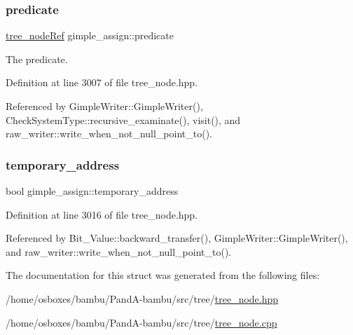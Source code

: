 \subsubsection{\texorpdfstring{predicate}{predicate}}
{\footnotesize\ttfamily \hyperlink{tree__node_8hpp_a6ee377554d1c4871ad66a337eaa67fd5}{tree\+\_\+node\+Ref} gimple\+\_\+assign\+::predicate}



The predicate. 



Definition at line 3007 of file tree\+\_\+node.\+hpp.



Referenced by Gimple\+Writer\+::\+Gimple\+Writer(), Check\+System\+Type\+::recursive\+\_\+examinate(), visit(), and raw\+\_\+writer\+::write\+\_\+when\+\_\+not\+\_\+null\+\_\+point\+\_\+to().

\mbox{\label{structgimple__assign_aa674c74327e0f2f526424ca35dd453c8}} 
\subsubsection{\texorpdfstring{temporary\+\_\+address}{temporary\_address}}
{\footnotesize\ttfamily bool gimple\+\_\+assign\+::temporary\+\_\+address}



Definition at line 3016 of file tree\+\_\+node.\+hpp.



Referenced by Bit\+\_\+\+Value\+::backward\+\_\+transfer(), Gimple\+Writer\+::\+Gimple\+Writer(), and raw\+\_\+writer\+::write\+\_\+when\+\_\+not\+\_\+null\+\_\+point\+\_\+to().



The documentation for this struct was generated from the following files\+:\begin{DoxyCompactItemize}
\item 
/home/osboxes/bambu/\+Pand\+A-\/bambu/src/tree/\hyperlink{tree__node_8hpp}{tree\+\_\+node.\+hpp}\item 
/home/osboxes/bambu/\+Pand\+A-\/bambu/src/tree/\hyperlink{tree__node_8cpp}{tree\+\_\+node.\+cpp}\end{DoxyCompactItemize}
